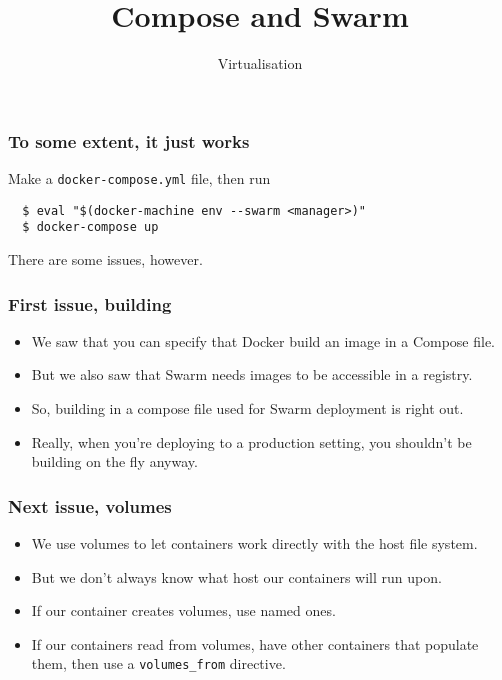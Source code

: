 \documentclass[10pt]{beamer}
\title{Compose and Swarm}
\author[I720]{Virtualisation}
\institute[Otago Polytechnic]{
  Otago Polytechnic \\
  Dunedin, New Zealand \\
}
\date{}
\begin{document}
\begin{frame}[plain]
  \titlepage
\end{frame}

\begin{frame}[fragile]
  \frametitle{To some extent, it just works}
  
  Make a \texttt{docker-compose.yml} file, then run
  
  \begin{verbatim}
  $ eval "$(docker-machine env --swarm <manager>)"
  $ docker-compose up
   \end{verbatim}
   
   There are some issues, however.
\end{frame}

\begin{frame}
  \frametitle{First issue, building}
   
   \begin{itemize}
     \item We saw that you can specify that Docker build an image in a Compose file.
     \item But we also saw that Swarm needs images to be accessible in a registry.
     \item So, building in a compose file used for Swarm deployment is right out.
     \item Really, when you're deploying to a production setting, you shouldn't be building on the fly anyway.
   \end{itemize}
\end{frame}

\begin{frame}
  \frametitle{Next issue, volumes}
   
   \begin{itemize}
     \item We use volumes to let containers work directly with the host file system.
     \item But we don't always know what host our containers will run upon.
     \item If our container creates volumes, use named ones.
     \item If our containers read from volumes, have other containers that populate them, then use a \texttt{volumes\_from} directive.
   \end{itemize}
\end{frame}
\end{document}
